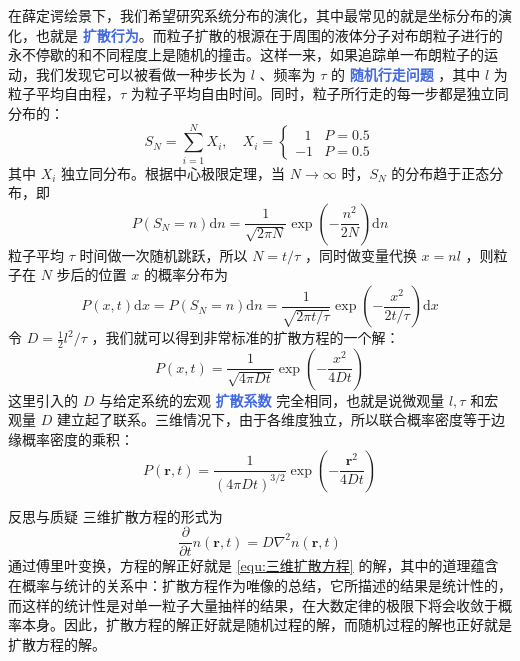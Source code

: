 在薛定谔绘景下，我们希望研究系统分布的演化，其中最常见的就是坐标分布的演化，也就是 \textcolor{RoyalBlue}{\textbf{\kaishu 扩散行为}}。而粒子扩散的根源在于周围的液体分子对布朗粒子进行的永不停歇的和不同程度上是随机的撞击。这样一来，如果追踪单一布朗粒子的运动，我们发现它可以被看做一种步长为 $l$ 、频率为 $\tau$ 的 \textcolor{RoyalBlue}{\textbf{\kaishu 随机行走问题}} ，其中 $l$ 为粒子平均自由程，$\tau$ 为粒子平均自由时间。同时，粒子所行走的每一步都是独立同分布的：
\begin{equation}\label{equ:S_N}
    S_N = \sum_{i=1}^N X_i,\quad X_i = \left\{\begin{array}{lll}
        ~~~1 & P = 0.5 \\
        -1& P = 0.5
        \end{array}\right.
\end{equation}
其中 $X_i$ 独立同分布。根据中心极限定理，当 $N\rightarrow \infty$ 时，$S_N$ 的分布趋于正态分布，即
\begin{equation}\label{equ:S_N的分布}
    P(S_N = n)\mathrm{d}n = \frac{1}{\sqrt{2\pi N}}\exp\left(-\frac{n^2}{2N}\right) \mathrm{d}n
\end{equation}
粒子平均 $\tau$  时间做一次随机跳跃，所以 $N = t / \tau$ ，同时做变量代换 $x = nl$ ，则粒子在 $N$ 步后的位置 $x$ 的概率分布为
\begin{equation}\label{equ:布朗运动的概率分布}
    P(x,t)\mathrm{d}x = P(S_N = n)\mathrm{d}n = \frac{1}{\sqrt{2\pi t / \tau}}\exp\left(-\frac{x^2}{2t / \tau}\right) \mathrm{d}x
\end{equation}
令 $D = \frac{1}{2} l^2/\tau$ ，我们就可以得到非常标准的扩散方程的一个解：
\begin{equation}\label{equ:扩散方程的解}
    P(x,t) = \frac{1}{\sqrt{4\pi Dt}}\exp\left(-\frac{x^2}{4Dt}\right)
\end{equation}
这里引入的 $D$ 与给定系统的宏观 \textcolor{RoyalBlue}{\textbf{\kaishu 扩散系数}} 完全相同，也就是说微观量 $l,\tau$ 和宏观量 $D$ 建立起了联系。三维情况下，由于各维度独立，所以联合概率密度等于边缘概率密度的乘积：
\begin{equation}\label{equ:三维扩散方程}
    P(\bm{r},t) = \frac{1}{(4\pi Dt)^{3/2}}\exp\left(-\frac{\bm{r}^2}{4Dt}\right)
\end{equation}
\begin{justification}{反思与质疑}
\kaishu \fontsize{11pt}{16pt}
    \quad\quad  三维扩散方程的形式为
    \[
        \frac{\partial }{\partial t}n(\bm r, t) = D\nabla^2 n(\bm r, t)
    \]
    通过傅里叶变换，方程的解正好就是 \eqref{equ:三维扩散方程} 的解，其中的道理蕴含在概率与统计的关系中：扩散方程作为唯像的总结，它所描述的结果是统计性的，而这样的统计性是对单一粒子大量抽样的结果，在大数定律的极限下将会收敛于概率本身。因此，扩散方程的解正好就是随机过程的解，而随机过程的解也正好就是扩散方程的解。
\end{justification}

